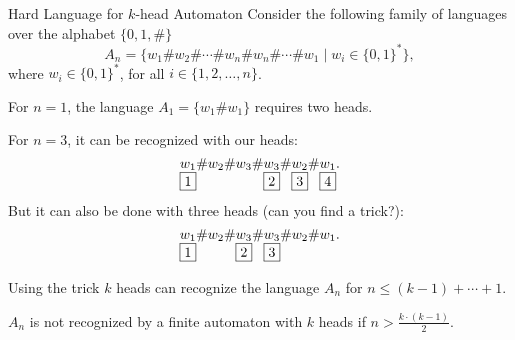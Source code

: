 \documentclass[aspectratio=169]{beamer}
\newcommand{\bits}{\{0,1\}}
\newcommand{\bitstr}{\bits^*}
\begin{document}
\begin{frame}[fragile]{Hard Language for $k$-head Automaton}
    Consider the following family of languages over the alphabet $\{0,1,\#\}$
    \[
    A_n = \{w_1\#w_2\#\dotsb\#w_n\#w_n\#\dotsb\#w_1 \mid w_i \in \bitstr\},
    \]
    where $w_i \in \bitstr$, for all $i \in \{1,2,\dotsc,n\}$.

    For $n = 1$, the language $A_1 = \{w_1\#w_1\}$ requires two heads.\pause

    For $n = 3$, it can be recognized with our heads:
    \[
    \underset{\fbox{1}}{w_1}\#w_2\#w_3\#\underset{\fbox{2}}{w_3}\#\underset{\fbox{3}}{w_2}\#\underset{\fbox{4}}{w_1}.
    \]\pause
    But it can also be done with three heads (can you find a trick?):\pause
    \[
    \underset{\fbox{1}}{w_1}\#w_2\#\underset{\fbox{2}}{w_3}\#\underset{\fbox{3}}{w_3}\#w_2\#w_1.
    \]\pause

    Using the trick $k$ heads can recognize the language $A_n$ for $n \le (k-1) + \dotsb + 1$.
    \begin{lemma}
        $A_n$ is not recognized by a finite automaton with $k$ heads if $n > \frac{k \cdot (k-1)}{2}$.
    \end{lemma}
\end{frame}
\end{document}
